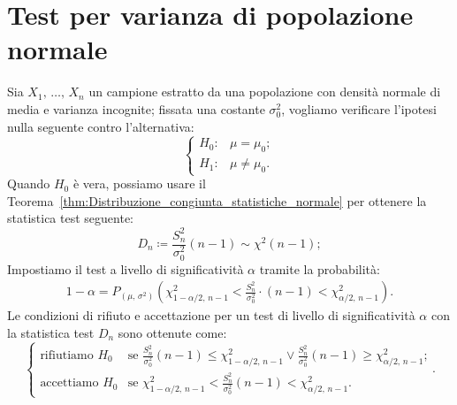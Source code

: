     \section{Test per varianza di popolazione normale}
    \begin{defn}
        Sia $X_1,\, \ldots,\, X_{n}$ un campione estratto da una popolazione con densità normale di media e 
        varianza incognite; fissata una costante $\sigma^2_0$, vogliamo verificare l'ipotesi nulla seguente 
        contro l'alternativa: \[
            \begin{cases}
                H_0 : & \mu = \mu_0; \\
                H_1 : & \mu \neq \mu_0.
            \end{cases}
        \] Quando $H_0$ è vera, possiamo usare il Teorema~\ref{thm:Distribuzione_congiunta_statistiche_normale} 
        per ottenere la statistica test seguente: \[
            D_n \coloneqq \frac{S_n^2}{\sigma_0^2}(n-1) \sim  \chi^2(n-1)
        ;\] Impostiamo il test a livello di significatività $\alpha$ tramite la probabilità:
        \begin{align*}
            1-\alpha = P_{(\mu,\,\sigma^2)}\left(\chi^2_{1-\alpha /2,\,n-1} < \frac{S_n^2}{\sigma_0^2}\cdot(n-1) 
            < \chi^2_{\alpha /2,\,n-1}\right)
        .\end{align*}
        Le condizioni di rifiuto e accettazione per un test di livello di significatività $\alpha$ con la 
        statistica test $D_n$ sono ottenute come: \[
            \begin{cases}
                \text{rifiutiamo } H_0 & 
                \text{se $\frac{S_n^2}{\sigma_0^2}(n-1) \leq \chi^2_{1-\alpha /2,\,n-1} \lor 
                \frac{S_n^2}{\sigma_0^2}(n-1) \geq \chi^2_{\alpha /2,\,n-1}$;} \\
                \text{accettiamo } H_0 & 
                \text{se $\chi^2_{1-\alpha/2,\,n-1} < \frac{S_n^2}{\sigma_0^2}(n-1) < \chi^2_{\alpha/2,\,n-1}$.}
            \end{cases}
        .\] 
    \end{defn}

